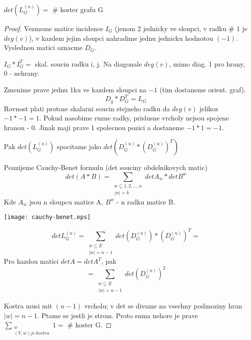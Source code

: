 \begin{theorem}
	$ det(L^{(n)}_G) = $ \# koster grafu G
\end{theorem}
\begin{proof}
	Vezmeme matice incidence $ I_G $ (jenom 2 jednicky ve sloupci, v radku \# 1 je $deg(v)$), v kazdem jejim sloupci nahradime jednu jednicku hodnotou $(-1)$. Vyslednou matici oznacme $D_G$.

	$ I_G * I_G^T = $ skal. soucin radku i, j. Na diagonale $deg(v)$, mimo diag. 1 pro hrany, 0 - nehrany.

	Zmenime prave jednu 1ku ve kazdem sloupci na $-1$ (tim dostaneme orient. graf).
	\[ D_g * D_G^T = L_G \]
	Rovnost plati protoze skalarni soucin stejneho radku da $deg(v)$ jelikoz $ -1 * -1 = 1 $. Pokud nasobime ruzne radky, prislusne vrcholy nejsou spojene hranou - 0. Jinak maji prave 1 spolecnou pozici a dostaneme $-1 * 1 = -1$.

	Pak $det(L^{(u)}_G)$ spocitame jako $det(D^{(u)}_G * (D^{(u)}_G)^T)$

	Pouzijeme Cauchy-Benet formulu (det souciny obdelnikovych matic)
	\[ det(A*B) = \sum _{\substack{ w \subseteq {1,2, ..., n} \\ |w| = k}} det A_w * det B^w \]
	Kde $ A_w $ jsou n sloupcu matice A, $ B^w $ - n radku matice B.

	\texttt{[image: cauchy-benet.eps]}

	\[ det L^{(u)}_G = \sum_{\substack{w \subseteq E \\ |w| = n-1}} det(D^{(u)}_G) * (D^{(u)}_G)^{T} = \]
	Pro kazdou matici $ det A = det A^T $, pak
	\[ = \sum_{\substack{w \subseteq E \\ |w| = n-1}} det(D^{(u)}_G)^2 \]

	Kostra musi mit $(n-1)$ vrcholu; v det se divame na vsechny podmoziny hran $|w| = n - 1$.
	Ptame se jestli je strom. Proto suma nehore je prave $ \sum_{\substack{w \\ (V,w) je \ kostra}} 1 = $ \# koster G.


\end{proof}

